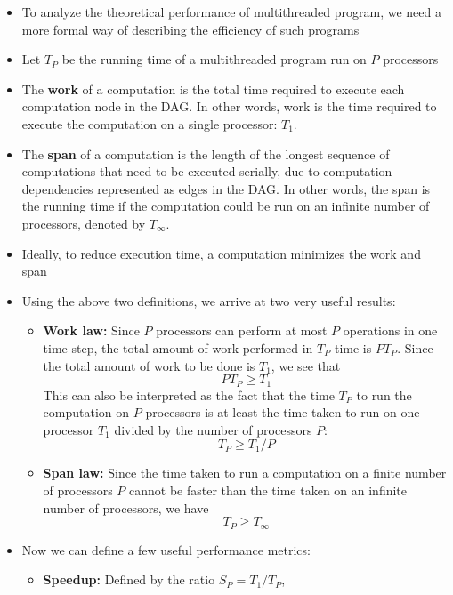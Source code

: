 \documentclass[bsc,frontabs,singlespacing,parskip,deptreport,normalheadings]{infthesis}
\begin{document}
\begin{itemize}
    \item To analyze the theoretical performance of multithreaded program, we
        need a more formal way of describing the efficiency of such programs
    \item Let \(T_P\) be the running time of a multithreaded program run on
        \(P\) processors
    \item The \textbf{work} of a computation is the total time required to
        execute each computation node in the DAG. In other words, work is the
        time required to execute the computation on a single processor: \(T_1\).
    \item The \textbf{span} of a computation is the length of the longest
        sequence of computations that need to be executed serially, due to
        computation dependencies represented as edges in the DAG. In other
        words, the span is the running time if the computation could be run on
        an infinite number of processors, denoted by \(T_\infty\).
    \item Ideally, to reduce execution time, a computation minimizes the work
        and span
    \item Using the above two definitions, we arrive at two very useful results:
    \begin{itemize}
        \item \textbf{Work law:} Since \(P\) processors can perform at most
            \(P\) operations in one time step, the total amount of work
            performed in \(T_P\) time is \(P T_P\). Since the total amount of
            work to be done is \(T_1\), we see that \[P T_P \geq T_1\] This can
            also be interpreted as the fact that the time \(T_P\) to run the
            computation on \(P\) processors is at least the time taken to run on
            one processor \(T_1\) divided by the number of processors \(P\):
            \[T_P \geq T_1 / P\]
        \item \textbf{Span law:} Since the time taken to run a computation on a
            finite number of processors \(P\) cannot be faster than the time
            taken on an infinite number of processors, we have \[T_P \geq
            T_\infty\]
    \end{itemize}
    \item Now we can define a few useful performance metrics:
    \begin{itemize}
        \item \textbf{Speedup:} Defined by the ratio \(S_P = T_1 / T_P\),

\end{itemize}
\end{itemize}
\end{document}
